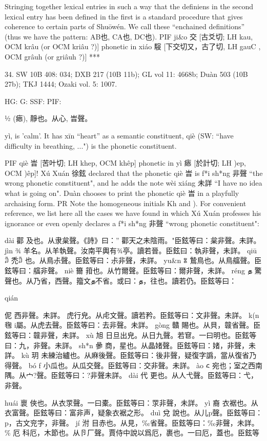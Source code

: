     Stringing together lexical entries in such a way that the definiens in the second lexical entry has been defined in the first is a standard procedure that gives coherence to certain parts of Shuōwén. We call these ``enchained definitions'' (thus we have the pattern: AB也, CA也, DC也).
PIF	ji&o 交 [古爻切; LH kau, OCM krâu (or OCM kriâu ?)] phonetic in xiáo 䮟 [下交切又，古了切, LH gauC , OCM grâuh (or griâuh ?)]
***

34. SW 10B 408: 034; DXB 217 (10B 11b); GL vol 11: 4668b; Duàn 503 (10B 27b); TKJ 1444; Ozaki vol. 5: 1007.


HG:
G: SSF: PIF:

½ (瘱), 靜也。从心,
旹聲。

yì,
is 'calm'.
It has xīn ``heart'' as a semantic constituent,
qiè (SW: ``have difficulty in breathing, ...") is the phonetic constituent.

PIF     qiè 旹 [苦叶切; LH khep, OCM khêp] phonetic in yì 瘱 [於計切; LH )ep, OCM )êp]!
    Xú Xuán 徐鉉 declared that the phonetic qiè 旹 is f*i sh*ng 非聲 ``the wrong phonetic constituent", and he adds the note wèi xiáng 未詳 ``I have no idea what is going on".
Duàn chooses to print the phonetic qiè 旹 in a playfully archaising form.
PR	Note the homogeneous initials Kh and ).
For convenient reference, we list here all the cases we have found in which Xú Xuán professes his ignorance or even openly declares a f*i sh*ng 非聲 ``wrong phonetic constituent":

dài
酄
及也。从隶枲聲。《詩》曰：'' 酄天之未陰雨。"臣鉉等曰：枲非聲。未詳。
jìn
¾
羊名。从羊執聲。汝南平輿有¾亭。讀若晉。臣鉉曰：執非聲，未詳。
qiū
ꇛ
禿ꇛ 也。从鳥尗聲。臣鉉等曰：尗非聲，未詳。
yu&n
ꇢ
鷙鳥也。从鳥䒇聲。臣鉉等曰：䒇非聲。
niè
籋
箝也。从竹爾聲。臣鉉等曰：爾非聲，未詳。
réng
த
驚聲也。从乃省，西聲。籀文த不省。或曰：த，往也。讀若仍。臣鉉等曰：

qián

伲
西非聲。未詳。
虎行皃。从虍文聲。讀若矜。臣鉉等曰：文非聲。未詳。
k(n
毱
i屬。从虎去聲。臣鉉等曰：去非聲。未詳。
gòng
贛
賜也。从貝，竷省聲。臣鉉等曰：竷非聲，未詳。
xù
旭
日旦出皃。从日九聲。若䆞。一曰明也。臣鉉等曰：九，非聲。未詳。
sh*n
曑
商，星也。从晶媎聲。臣鉉等曰：媎，非聲，未詳。
kù
玥
未練治纑也。从麻後聲。臣鉉等曰：後非聲，疑復字譌，當从復省乃得聲。
bó
ƒ
小瓜也。从瓜交聲。臣鉉等曰：交非聲。未詳。
ào
᱈
宛也；室之西南隅。从宀?聲。臣鉉等曰：?非聲未詳。
dài
代
更也。从人弋聲。臣鉉等曰：弋，非聲。




huái
褱
俠也。从衣眔聲。一曰橐。臣鉉等曰：眔非聲，未詳。
yì
裔
衣裾也。从衣富聲。臣鉉等曰：富非声，疑象衣裾之形。
duì
兌
說也。从儿p聲。臣鉉等曰：p，古文兖字，非聲。
jí
泭
目赤也。从見，‰省聲。臣鉉等曰：‰非聲，未詳。
\%
厄
科厄，木節也。从卪厂聲。賈侍中說以爲厄，裹也。一曰厄，蓋也。臣鉉等


